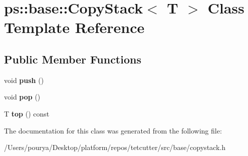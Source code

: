 \hypertarget{classps_1_1base_1_1CopyStack}{}\section{ps\+:\+:base\+:\+:Copy\+Stack$<$ T $>$ Class Template Reference}
\label{classps_1_1base_1_1CopyStack}
\subsection*{Public Member Functions}
\begin{DoxyCompactItemize}
\item 
\hypertarget{classps_1_1base_1_1CopyStack_aedc65d91fff918626f1b33d0edeaf204}{}void {\bfseries push} ()\label{classps_1_1base_1_1CopyStack_aedc65d91fff918626f1b33d0edeaf204}

\item 
\hypertarget{classps_1_1base_1_1CopyStack_a1c2f916850d0664b28f8be8859af9a75}{}void {\bfseries pop} ()\label{classps_1_1base_1_1CopyStack_a1c2f916850d0664b28f8be8859af9a75}

\item 
\hypertarget{classps_1_1base_1_1CopyStack_ad0300e44d46ce2078ce2a8b3966b909f}{}T {\bfseries top} () const \label{classps_1_1base_1_1CopyStack_ad0300e44d46ce2078ce2a8b3966b909f}

\end{DoxyCompactItemize}


The documentation for this class was generated from the following file\+:\begin{DoxyCompactItemize}
\item 
/\+Users/pourya/\+Desktop/platform/repos/tetcutter/src/base/copystack.\+h\end{DoxyCompactItemize}
